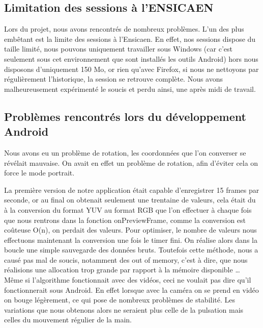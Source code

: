 \subsection{Limitation des sessions à l'ENSICAEN}

Lors du projet, nous avons rencontrés de nombreux problèmes. L'un des plus embêtant est la limite des sessions à l'Ensicaen. En effet, nos sessions dispose du taille limité, nous pouvons uniquement travailler sous Windows (car
c'est seulement sous cet environnement que sont installés les outils Android) hors nous disposons d'uniquement 150 Mo, or rien qu'avec Firefox, si nous ne nettoyons par régulièrement l'historique, la session se retrouve 
complète. Nous avons malheureusement expérimenté le soucis et perdu ainsi, une après midi de travail. 

\subsection{Problèmes rencontrés lors du développement Android}

Nous avons eu un problème de rotation, les coordonnées que l'on converser se révélait mauvaise. On avait en effet un problème de rotation, afin d'éviter cela on force le mode portrait.

La première version de notre application était capable d'enregistrer 15 frames par seconde, or au final on obtenait seulement une trentaine de valeurs, cela était du à la conversion du format YUV au format RGB que l'on 
effectuer à chaque fois que nous rentrons dans la fonction onPreviewFrame, comme la conversion est coûteuse O(n), on perdait des valeurs. Pour optimiser, le nombre de valeurs nous effectuons maintenant la conversion
une fois le timer fini. On réalise alors dans la boucle une simple sauvegarde des données bruts. 
Toutefois cette méthode, nous a causé pas mal de soucis, notamment des out of memory, c'est à dire, que nous réalisions une allocation trop grande par rapport à la mémoire disponible \ldots{}
\\
Même si l'algorithme fonctionnait avec des vidéos, ceci ne voulait pas dire qu'il fonctionnerait sous Android.
En effet lorsque avec la caméra on se prend en vidéo on bouge légèrement, ce qui pose de nombreux problèmes de stabilité. 
Les variations que nous obtenons alors ne seraient plus celle de la pulsation mais celles du mouvement régulier de la main.


